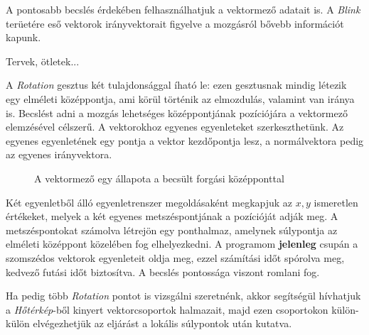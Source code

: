A pontosabb becslés érdekében felhasználhatjuk a vektormező adatait is. A \textit{Blink} terüetére eső vektorok irányvektorait figyelve a mozgásról bővebb információt kapunk.

Tervek, ötletek...


A \textit{Rotation} gesztus két tulajdonsággal íható le: ezen gesztusnak mindig létezik egy elméleti középpontja, ami körül történik az elmozdulás, valamint van iránya is.
Becslést adni a mozgás lehetséges középpontjának pozíciójára a vektormező elemzésével célszerű.
A vektorokhoz egyenes egyenleteket szerkeszthetünk. Az egyenes egyenletének egy pontja a vektor kezdőpontja lesz, a normálvektora pedig az egyenes irányvektora.

\begin{figure}[h]
\centering
{}
\caption{A vektormező egy állapota a becsült forgási középponttal}
\label{fig:rotation}
\end{figure}

Két egyenletből álló egyenletrenszer megoldásaként megkapjuk az $x,y$ ismeretlen értékeket, melyek a két egyenes metszéspontjának a pozícióját adják meg.
A metszéspontokat számolva létrejön egy ponthalmaz, amelynek súlypontja az elméleti középpont közelében fog elhelyezkedni.
A programom \textbf{jelenleg} csupán a szomszédos vektorok egyenleteit oldja meg, ezzel számítási időt spórolva meg, kedvező futási időt biztosítva. A becslés pontossága viszont romlani fog.

Ha pedig több \textit{Rotation} pontot is vizsgálni szeretnénk, akkor segítségül hívhatjuk a \textit{Hőtérkép}-ből kinyert vektorcsoportok halmazait, majd ezen csoportokon külön-külön elvégezhetjük az eljárást a lokális súlypontok után kutatva.

